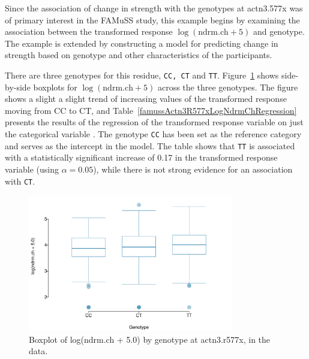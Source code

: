 Since the association of change in strength with the genotypes at actn3.577x was of primary interest in the FAMuSS study, this example begins by examining the association between the transformed response $\log(\text{ndrm.ch} + 5)$ and genotype.  The example is extended by constructing a model for predicting change in strength based on genotype and other characteristics of the participants.

There are three genotypes for this residue, \texttt{CC, CT} and \texttt{TT}. Figure~\ref{logNdrmChActn3R577xBoxPlot} shows side-by-side boxplots for $\log(\text{ndrm.ch} + 5)$ across the three genotypes.  The figure shows a slight a slight trend of increasing values of the transformed response moving from CC to CT, and Table~\ref{famussActn3R577xLogNdrmChRegression} presents the results of the regression of the transformed response variable on just the categorical variable .   The genotype \texttt{CC} has been set as the reference category and serves as the intercept in the model.  The table shows that \texttt{TT} is associated with a statistically significant increase of  0.17 in the transformed response variable (using $\alpha = 0.05$), while there is not strong evidence for an association with \texttt{CT}.  

 \begin{figure}[h!]
 	\centering
 	\includegraphics[width=0.8\textwidth]
	{ch_multiple_linear_regression_oi_biostat/figures/logNdrmChActn3R577xBoxPlot/logNdrmChActn3R577xBoxPlot.pdf}
 	\caption{Boxplot of log(ndrm.ch + 5.0) by genotype at actn3.r577x, in the   data.}
	\label{logNdrmChActn3R577xBoxPlot}
 \end{figure}
 

